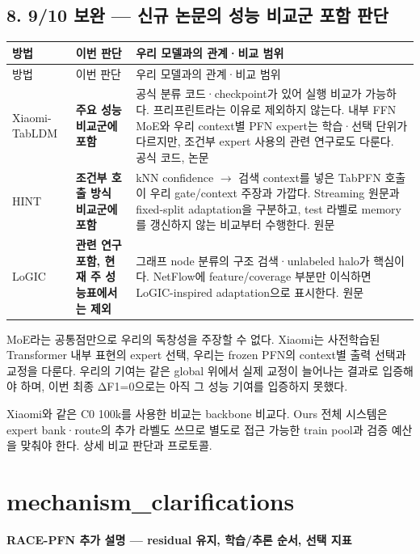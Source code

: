 \subsection{8. 9/\allowbreak{}10 보완 — 신규 논문의 성능 비교군 포함 판단}
\begingroup
\footnotesize
\begin{longtable}{>{\raggedright\arraybackslash}p{}>{\raggedright\arraybackslash}p{}>{\raggedright\arraybackslash}p{}}
\toprule
방법 & 이번 판단 & 우리 모델과의 관계·비교 범위 \\ \midrule
\endfirsthead
방법 & 이번 판단 & 우리 모델과의 관계·비교 범위 \\ \midrule
\endhead
{}Xiaomi-TabLDM & \textbf{주요 성능 비교군에 포함} & 공식 분류 코드·checkpoint가 있어 실행 비교가 가능하다. 프리프린트라는 이유로 제외하지 않는다. 내부 FFN MoE와 우리 context별 PFN expert는 학습·선택 단위가 다르지만, 조건부 expert 사용의 관련 연구로도 다룬다. 공식 코드, 논문 \\
{}HINT & \textbf{조건부 호출 방식 비교군에 포함} & kNN confidence  \ensuremath{\rightarrow}  검색 context를 넣은 TabPFN 호출이 우리 gate/\allowbreak{}context 주장과 가깝다. Streaming 원문과 fixed-split adaptation을 구분하고, test 라벨로 memory를 갱신하지 않는 비교부터 수행한다. 원문 \\
{}LoGIC & \textbf{관련 연구 포함, 현재 주 성능표에서는 제외} & 그래프 node 분류의 구조 검색·unlabeled halo가 핵심이다. NetFlow에 feature/\allowbreak{}coverage 부분만 이식하면 LoGIC-inspired adaptation으로 표시한다. 원문 \\
\bottomrule
\end{longtable}
\endgroup
MoE라는 공통점만으로 우리의 독창성을 주장할 수 없다. Xiaomi는 사전학습된 Transformer 내부 표현의 expert 선택, 우리는 frozen PFN의 context별 출력 선택과 교정을 다룬다. 우리의 기여는 같은 global 위에서 실제 교정이 늘어나는 결과로 입증해야 하며, 이번 최종 ΔF1=\allowbreak{}0으로는 아직 그 성능 기여를 입증하지 못했다.

Xiaomi와 같은 C0 100k를 사용한 비교는 backbone 비교다. Ours 전체 시스템은 expert bank·route의 추가 라벨도 쓰므로 별도로 접근 가능한 train pool과 검증 예산을 맞춰야 한다. 상세 비교 판단과 프로토콜.



\section{mechanism\_\allowbreak{}clarifications}
\textbf{RACE-PFN 추가 설명 — residual 유지, 학습/\allowbreak{}추론 순서, 선택 지표}

